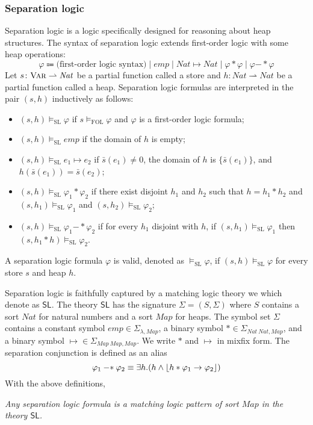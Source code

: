 \documentclass[letter,12pt]{article}
\newcommand{\imp}{\to}
\newcommand{\Var}{\textnormal{\textsc{Var}}}
\newcommand{\sig}{{\Sigma}}
\newcommand{\MLSL}{\mathsf{SL}}
\DeclarePairedDelimiter{\floor}{\lfloor}{\rfloor}
\newcommand{\Nat}{\mathit{Nat}}
\newcommand{\Map}{\mathit{Map}}
\newcommand{\emp}{\mathit{emp}}
\newcommand{\simp}{\mathbin{-*}}
\newcommand{\merge}{\mathbin{*}}
\newcommand{\pto}{\rightharpoonup}
\newcommand{\SL}{{\text{SL}}}
\newcommand{\FOL}{{\text{FOL}}}
\begin{document}
\subsubsection{Separation logic}
\label{sec_separation_logic}

Separation logic is a logic specifically designed for reasoning about
heap structures.
The syntax of separation logic extends first-order logic with
some heap operations:
\begin{equation*}
\varphi \Coloneqq
\text{(first-order logic syntax)}
\mid \emp \mid \Nat \mapsto \Nat \mid \varphi \merge \varphi
\mid \varphi \simp \varphi
\end{equation*}
Let $s \colon \Var \pto \Nat$ be a partial function called a store
and $h \colon \Nat \pto \Nat$ be a partial function called a heap.
Separation logic formulas are interpreted in the pair $(s,h)$
inductively as follows:
\begin{itemize}
\item $(s,h) \vDash_{\SL} \varphi$
      if $s \vDash_{\FOL} \varphi$ and $\varphi$ is a first-order logic formula;
\item $(s,h) \vDash_\SL \emp$ if the domain of $h$ is empty;
\item $(s,h) \vDash_\SL e_1 \mapsto e_2$
      if $\bar{s}(e_1) \neq 0$, the domain of $h$ is $\{ \bar{s}(e_1) \}$, and 
      $h( \bar{s}(e_1) ) = \bar{s}(e_2)$;
\item $(s,h) \vDash_\SL \varphi_1 \merge \varphi_2$ if
      there exist disjoint $h_1$ and $h_2$ such that
      $h = h_1 \merge h_2$ and
      $(s,h_1) \vDash_\SL \varphi_1$
      and $(s, h_2) \vDash_\SL \varphi_2$;
\item $(s,h) \vDash_\SL \varphi_1 \simp \varphi_2$ if
      for every $h_1$ disjoint with $h$,
      if $(s,h_1) \vDash_\SL \varphi_1$ then
      $(s,h_1 \merge h) \vDash_\SL \varphi_2$.
\end{itemize}
A separation logic formula $\varphi$ is valid,
denoted as $\vDash_\SL \varphi$,
if $(s,h)\vDash_\SL \varphi$ for every store $s$ and heap $h$.

Separation logic is faithfully captured by a matching logic theory
we which denote as $\MLSL$.
The theory $\MLSL$ has the signature
$\sig = (S, \Sigma)$ 
where $S$ contains a sort $\Nat$ for natural numbers and
a sort $\Map$ for heaps. 
The symbol set $\Sigma$ contains
a constant symbol $\emp \in \Sigma_{\lambda,\Map}$,
a binary symbol $* \in \Sigma_{\Nat\ \Nat,\Map}$,
and a binary symbol $\mapsto \in \Sigma_{\Map\ \Map,\Map}$.
We write $*$ and $\mapsto$ in mixfix form.
The separation conjunction is defined as an alias
\begin{equation*}
\varphi_1 \simp \varphi_2 \equiv
\exists h . ( h \wedge \floor{ h \merge \varphi_1 \imp \varphi_2 } )
\end{equation*}
With the above definitions,
\begin{center}
\em Any separation logic formula is a matching logic pattern of sort $\Map$
in the theory $\MLSL$.
\end{center}
\end{document}
